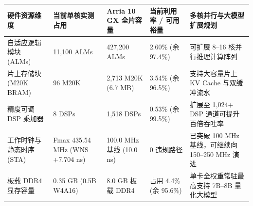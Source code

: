 \documentclass[11pt,a4paper]{article}
\begin{document}
{\footnotesize\renewcommand{\arraystretch}{1.14}\begin{longtable}{@{}L{0.19\textwidth}L{0.16\textwidth}L{0.16\textwidth}L{0.15\textwidth}L{0.24\textwidth}@{}}\toprule

\textbf{硬件资源维度} & \textbf{当前单核实测占用} & \textbf{Arria 10 GX 全片容量} & \textbf{当前利用率 /\allowbreak{} 可用裕量} & \textbf{多核并行与大模型扩展规划}\\\midrule\endhead

自适应逻辑模块 (\allowbreak{}ALMs)\allowbreak{} & 11,\allowbreak{}100 ALMs & 427,\allowbreak{}200 ALMs & 2.60\% (\allowbreak{}余 97.4\%)\allowbreak{} & 可扩展 8–16 核并行推理计算阵列\\[2pt]

片上存储块 (\allowbreak{}M20K BRAM)\allowbreak{} & 96 M20K & 2,\allowbreak{}713 M20K (\allowbreak{}6.7 MB)\allowbreak{} & 3.54\% (\allowbreak{}余 96.5\%)\allowbreak{} & 支持大容量片上 KV Cache 与双缓冲流水\\[2pt]

精度可调 DSP 乘加器 & 8 DSPs & 1,\allowbreak{}518 DSPs & 0.53\% (\allowbreak{}余 99.5\%)\allowbreak{} & 扩展至 1,\allowbreak{}024+\allowbreak{} DSP 通道可提升百倍吞吐率\\[2pt]

工作时钟与静态时序 (\allowbreak{}STA)\allowbreak{} & Fmax 435.54 MHz (\allowbreak{}WNS +\allowbreak{}7.704 ns)\allowbreak{} & 100.0 MHz 基线 (\allowbreak{}10.0 ns)\allowbreak{} & 0 违规路径 & 已突破 100 MHz 基线，可继续向 150–250 MHz 演进\\[2pt]

板载 DDR4 显存容量 & 0.35 GB (\allowbreak{}0.5B W4A16)\allowbreak{} & 8.0 GB 板载 DDR4 & 占用 4.4\% (\allowbreak{}余 95.6\%)\allowbreak{} & 单卡全权重常驻最高支持 7B–8B 量化大模型\\[2pt]

\bottomrule\end{longtable}}
\end{document}
